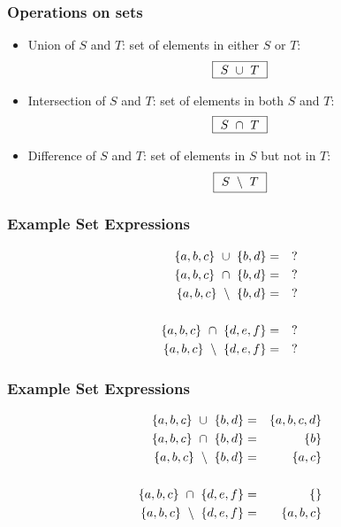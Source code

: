 \documentclass{beamer}
\begin{document}
\begin{frame}


\frametitle{Operations on sets}

\begin{itemize}
\item   \alert{Union} of $S$ and $T$: set of elements \alert{in either} $S$ \alert{or} $T$:
\begin{eqnarray*}
\fbox{~$
    S  ~\cup~ T
~$}
\end{eqnarray*}
\item   \alert{Intersection} of $S$ and $T$: set of elements \alert{in both} $S$ \alert{and} $T$:
\begin{eqnarray*}
\fbox{~$
    S  ~\cap~ T
~$}
\end{eqnarray*}
\item   \alert{Difference} of $S$ and $T$:  set of elements \alert{in}  $S$ \alert{but not in}  $T$:
\begin{eqnarray*}
\fbox{~$
    S  ~\setminus~ T
~$}
\end{eqnarray*}\end{itemize}




\end{frame}



\begin{frame}


\frametitle{Example Set Expressions}

\begin{eqnarray*}
\{a,b,c\} ~\cup~ \{b,d\} &=& ? \\
\{a,b,c\} ~\cap~ \{b,d\} &=& ? \\
\{a,b,c\} ~\setminus~ \{b,d\} &=& ? \\
~\\
\{a,b,c\} ~\cap~ \{d,e,f\} &=& ? \\
\{a,b,c\} ~\setminus~ \{d,e,f\}  &=& ? \\
\end{eqnarray*}




\end{frame}



\begin{frame}


\frametitle{Example Set Expressions}

\begin{eqnarray*}
\{a,b,c\} ~\cup~ \{b,d\} &=& \{a,b,c,d\} \\
\{a,b,c\} ~\cap~ \{b,d\} &=& \{b\} \\
\{a,b,c\} ~\setminus~ \{b,d\} &=& \{a,c\} \\
~\\
\{a,b,c\} ~\cap~ \{d,e,f\} &=& \{\} \\
\{a,b,c\} ~\setminus~ \{d,e,f\}  &=& \{a,b,c\}  \\
\end{eqnarray*}




\end{frame}
\end{document}

